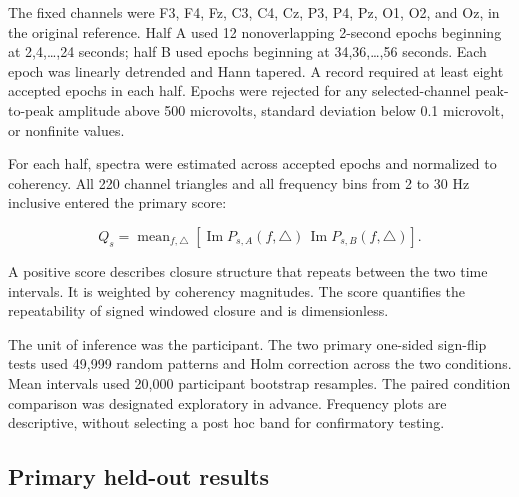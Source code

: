 \documentclass[11pt,a4paper]{article}
\begin{document}
The fixed channels were F3, F4, Fz, C3, C4, Cz, P3, P4, Pz, O1, O2, and Oz, in the original reference. Half A used 12 nonoverlapping 2-second epochs beginning at 2,4,\ldots,24 seconds; half B used epochs beginning at 34,36,\ldots,56 seconds. Each epoch was linearly detrended and Hann tapered. A record required at least eight accepted epochs in each half. Epochs were rejected for any selected-channel peak-to-peak amplitude above 500 microvolts, standard deviation below 0.1 microvolt, or nonfinite values.

For each half, spectra were estimated across accepted epochs and normalized to coherency. All 220 channel triangles and all frequency bins from 2 to 30 Hz inclusive entered the primary score:

\[Q_s=\operatorname{mean}_{f,\triangle}
\left[\operatorname{Im}P_{s,A}(f,\triangle)\,
\operatorname{Im}P_{s,B}(f,\triangle)\right].\]

A positive score describes closure structure that repeats between the two time intervals. It is weighted by coherency magnitudes. The score quantifies the repeatability of signed windowed closure and is dimensionless.

The unit of inference was the participant. The two primary one-sided sign-flip tests used 49,999 random patterns and Holm correction across the two conditions. Mean intervals used 20,000 participant bootstrap resamples. The paired condition comparison was designated exploratory in advance. Frequency plots are descriptive, without selecting a post hoc band for confirmatory testing.

\subsection{Primary held-out results}
\end{document}
